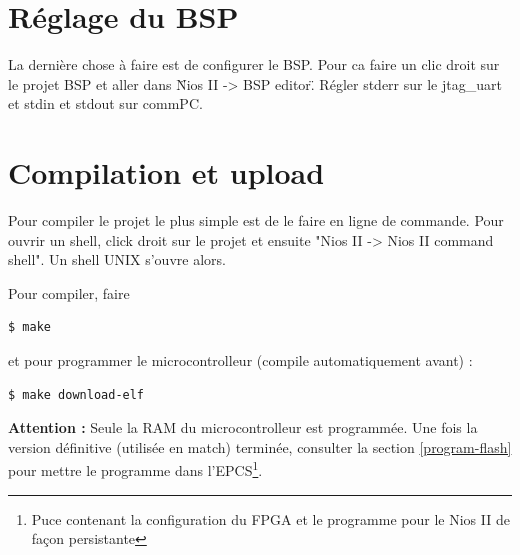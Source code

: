 \documentclass[a4paper]{paper}
\begin{document}
\section{Réglage du BSP}
La dernière chose à faire est de configurer le BSP. Pour ca faire un clic droit sur le
projet BSP et aller dans \"Nios II -> BSP editor\". Régler stderr sur le jtag\_uart et stdin et stdout sur commPC.

\section{Compilation et upload}
Pour compiler le projet le plus simple est de le faire en ligne de commande. Pour
ouvrir un shell, click droit sur le projet et ensuite "Nios II -> Nios II command shell". 
Un shell UNIX s'ouvre alors.

Pour compiler, faire
\begin{lstlisting}[frame=trBL]
$ make
\end{lstlisting}

et pour programmer le microcontrolleur (compile automatiquement avant) :
\begin{lstlisting}[frame=trBL]
$ make download-elf
\end{lstlisting}

\textbf{Attention :} Seule la RAM du microcontrolleur est programmée. Une fois la
version définitive (utilisée en match) terminée, consulter la section \ref{program-flash}
pour mettre le programme dans l'\textsc{EPCS}\footnote{Puce contenant la configuration du FPGA
et le programme pour le Nios II de façon persistante}.
\end{document}
